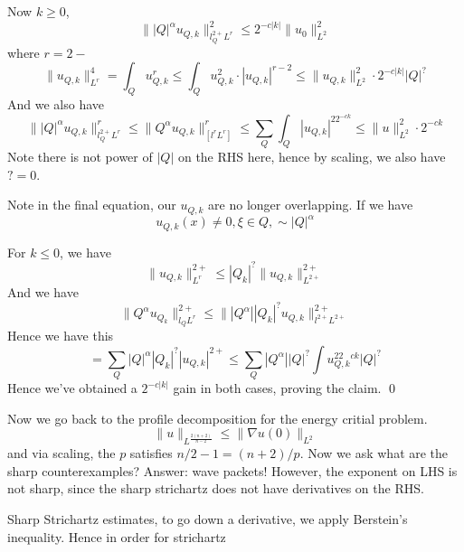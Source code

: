Now $k\geq 0$,
\begin{equation*}
    \||Q|^\alpha u_{Q,k}\|_{l_Q^{2+}L^{r}}^2\leq 2^{-c|k|}\|u_0\|_{L^2}^2
\end{equation*}
where $r=2-$
\begin{equation*}
    \|u_{Q,k}\|_{L^r}^4=\int_Qu_{Q,k}^r\leq\int_Qu_{Q,k}^2\cdot|u_{Q,k}|^{r-2}\leq\|u_{Q,k}\|_{L^2}^2\cdot 2^{-c|k|}|Q|^{?}
\end{equation*}
And we also have
\begin{equation*}
    \||Q|^\alpha u_{Q,k}\|_{l_Q^{2+}L^r}^r\leq\|Q^\alpha u_{Q,k}\|_[l^rL^r]^r\leq\sum_{Q}\int_Q|u_{Q,k}|^22^{-ck}\leq\|u\|_{L^2}^2\cdot 2^{-ck}
\end{equation*}
Note there is not power of $|Q|$ on the RHS here, hence by scaling, we also have $?=0$.
\begin{note}
    Note in the final equation, our $u_{Q,k}$ are no longer overlapping. If we have
    \begin{equation*}
        u_{Q,k}(x)\neq 0, \xi\in Q, \sim |Q|^\alpha
    \end{equation*}
\end{note}

For $k\leq 0$, we have
\begin{equation*}
    \|u_{Q,k}\|_{L^r}^{2+}\leq|Q_k|^?\|u_{Q,k}\|_{L^{2+}}^{2+}
\end{equation*}
And we have
\begin{equation*}
    \|Q^\alpha u_{Q_k}\|_{l_Q^{}L^r}^{2+}\leq\||Q^\alpha||Q_k|^?u_{Q,k}\|_{l^{2+}L^{2+}}^{2+}
\end{equation*}
Hence we have this 
\begin{equation*}
    =\sum_Q|Q|^\alpha|Q_k|^?|u_{Q,k}|^{2+}\leq\sum_Q|Q^\alpha||Q|^?\int u_{Q,k}^22^{ck}|Q|^?
\end{equation*}
Hence we've obtained a $2^{-c|k|}$ gain in both cases, proving the claim.
\qed

Now we go back to the profile decomposition for the energy critial problem.
\begin{equation*}
    \|u\|_{L^\frac{2(n+2)}{n-2}}\leq\|\nabla u(0)\|_{L^2}
\end{equation*}
and via scaling, the $p$ satisfies $n/2-1=(n+2)/p$. Now we ask what are the sharp counterexamples? Answer: wave packets! However, the exponent on LHS is not sharp, since the sharp strichartz does not have derivatives on the RHS.

Sharp Strichartz estimates, to go down a derivative, we apply Berstein's inequality. Hence in order for strichartz

